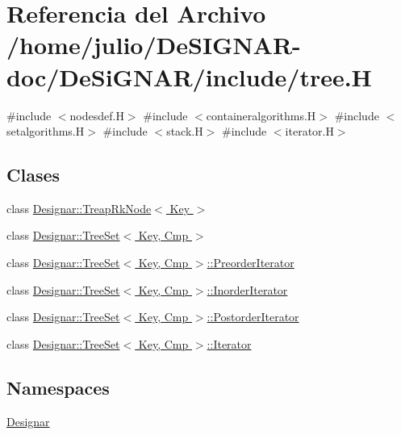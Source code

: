 \hypertarget{tree_8_h}{}\section{Referencia del Archivo /home/julio/\+De\+S\+I\+G\+N\+A\+R-\/doc/\+De\+Si\+G\+N\+A\+R/include/tree.H}
\label{tree_8_h}
{\ttfamily \#include $<$nodesdef.\+H$>$}\newline
{\ttfamily \#include $<$containeralgorithms.\+H$>$}\newline
{\ttfamily \#include $<$setalgorithms.\+H$>$}\newline
{\ttfamily \#include $<$stack.\+H$>$}\newline
{\ttfamily \#include $<$iterator.\+H$>$}\newline
\subsection*{Clases}
\begin{DoxyCompactItemize}
\item 
class \hyperlink{class_designar_1_1_treap_rk_node}{Designar\+::\+Treap\+Rk\+Node$<$ Key $>$}
\item 
class \hyperlink{class_designar_1_1_tree_set}{Designar\+::\+Tree\+Set$<$ Key, Cmp $>$}
\item 
class \hyperlink{class_designar_1_1_tree_set_1_1_preorder_iterator}{Designar\+::\+Tree\+Set$<$ Key, Cmp $>$\+::\+Preorder\+Iterator}
\item 
class \hyperlink{class_designar_1_1_tree_set_1_1_inorder_iterator}{Designar\+::\+Tree\+Set$<$ Key, Cmp $>$\+::\+Inorder\+Iterator}
\item 
class \hyperlink{class_designar_1_1_tree_set_1_1_postorder_iterator}{Designar\+::\+Tree\+Set$<$ Key, Cmp $>$\+::\+Postorder\+Iterator}
\item 
class \hyperlink{class_designar_1_1_tree_set_1_1_iterator}{Designar\+::\+Tree\+Set$<$ Key, Cmp $>$\+::\+Iterator}
\end{DoxyCompactItemize}
\subsection*{Namespaces}
\begin{DoxyCompactItemize}
\item 
 \hyperlink{namespace_designar}{Designar}
\end{DoxyCompactItemize}
